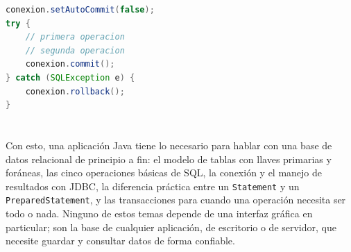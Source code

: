 \documentclass[10pt,a4paper]{article}
\begin{document}
\begin{lstlisting}[language=Java, caption={Transacción con dos operaciones dependientes}]
conexion.setAutoCommit(false);
try {
    // primera operacion
    // segunda operacion
    conexion.commit();
} catch (SQLException e) {
    conexion.rollback();
}
\end{lstlisting}

\section{\color{colorIPN}{Conclusión}}

Con esto, una aplicación Java tiene lo necesario para hablar con una base de datos relacional de principio a fin: el modelo de tablas con llaves primarias y foráneas, las cinco operaciones básicas de SQL, la conexión y el manejo de resultados con JDBC, la diferencia práctica entre un \texttt{Statement} y un \texttt{PreparedStatement}, y las transacciones para cuando una operación necesita ser todo o nada. Ninguno de estos temas depende de una interfaz gráfica en particular; son la base de cualquier aplicación, de escritorio o de servidor, que necesite guardar y consultar datos de forma confiable.


\pagebreak

\section{\color{colorIPN}{Referencias Bibliográficas}}
\nocite{*}
\color{colorESCOM}{
	\printbibliography[heading=none]
}
\end{document}
